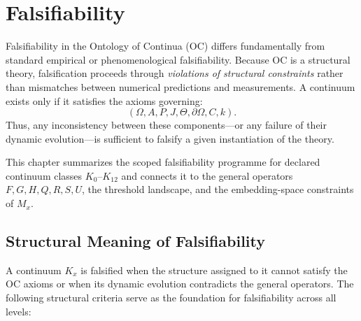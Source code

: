 

\section{Falsifiability}
\label{sec:falsifiability-master}

Falsifiability in the Ontology of Continua (OC) differs fundamentally
from standard empirical or phenomenological falsifiability.
Because OC is a structural theory, falsification proceeds through
\emph{violations of structural constraints} rather than mismatches
between numerical predictions and measurements.
A continuum exists only if it satisfies the axioms governing:
\[
(\Omega, A, P, J, \Theta, \partial\Omega, C, k).
\]
Thus, any inconsistency between these components—or any failure of
their dynamic evolution—is sufficient to falsify a given instantiation
of the theory.

This chapter summarizes the scoped falsifiability programme for
declared continuum classes $K_0$–$K_{12}$ and connects it to the general operators
$F, G, H, Q, R, S, U$, the threshold landscape, and the embedding-space
constraints of $M_x$.



\subsection{Structural Meaning of Falsifiability}

A continuum $K_x$ is falsified when the structure assigned to it
cannot satisfy the OC axioms or when its dynamic evolution contradicts
the general operators.
The following structural criteria serve as the foundation for
falsifiability across all levels:

